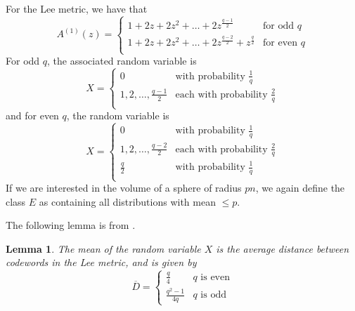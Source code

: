 \documentclass[conference,letterpaper]{IEEEtran}
\newtheorem{lemma}[theorem]{Lemma}
\begin{document}
For the Lee metric, we have that \cite{Berlekamp:2015:ACT:2834146}
\begin{equation}
        A^{(1)}(z) = 
            \begin{cases}
                1 + 2z + 2z^2 + \ldots + 2z^{\frac{q-1}{2}} & \text{for odd $q$} \\
                1 + 2z + 2z^2 + \ldots + 2z^{\frac{q-2}{2}} + z^{\frac{q}{2}} & \text{for even $q$} \\
            \end{cases}
    \end{equation}
For odd $q$, the associated random variable is 
\begin{equation}
    X = \begin{cases}
        0 & \text{with probability $\frac{1}{q}$} \\
        1, 2, \ldots, \frac{q-1}{2} & \text{each with probability $\frac{2}{q}$} \\
            \end{cases}
\end{equation}
and for even $q$, the random variable is
\begin{equation}
    X = \begin{cases}
        0 & \text{with probability $\frac{1}{q}$} \\
        1, 2, \ldots, \frac{q-2}{2} & \text{each with probability $\frac{2}{q}$} \\
        \frac{q}{2} & \text{with probability $\frac{1}{q}$}\\
            \end{cases}
\end{equation}
If we are interested in the volume of a sphere of radius $pn$, we again define the class $E$ as containing all distributions with mean $\leq p$.

The following lemma is from \cite{Berlekamp:2015:ACT:2834146}.

\begin{lemma}
The mean of the random variable $X$ is the average distance between codewords in the Lee metric, and is given by
\begin{equation}
        \overline{D} = \begin{cases}
            \frac{q}{4} & \text{$q$ is even}\\
            \frac{q^2 -1}{4q} & \text{$q$ is odd}
        \end{cases}
    \end{equation}
\end{lemma}
\end{document}
